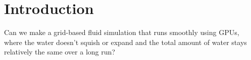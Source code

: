 \section{Introduction}
\label{sec:introduction}

Can we make a grid-based fluid simulation that runs smoothly using GPUs, where the water doesn’t squish or expand and 
the total amount of water stays relatively the same over a long run?

